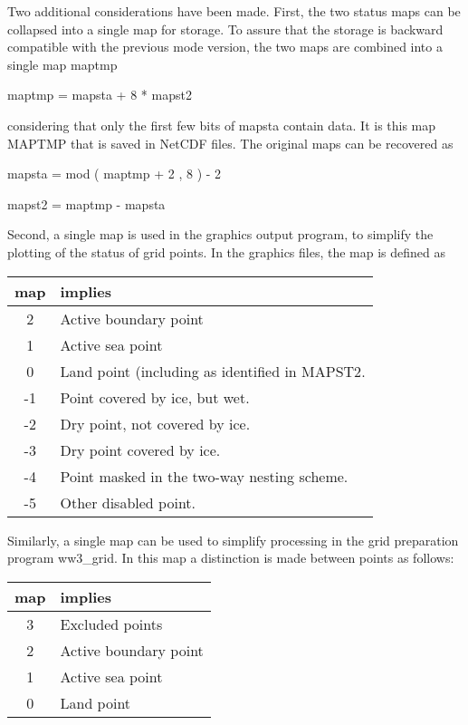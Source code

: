 \noindent
Two additional considerations have been made. First, the two status maps can
be collapsed into a single map for storage. To assure that the storage is
backward compatible with the previous mode version, the two maps are combined
into a single map {\F maptmp}

\vspace{\baselineskip}
\centerline{\F maptmp = mapsta + 8 * mapst2}
\vspace{\baselineskip}

\noindent
considering that only the first few bits of {\F mapsta} contain data.
It is this map MAPTMP that is saved in NetCDF files.  The
original maps can be recovered as

\vspace{\baselineskip}
\centerline{\F mapsta = mod ( maptmp + 2 , 8 ) - 2}
\centerline{\F mapst2 = maptmp - mapsta}
\vspace{\baselineskip}

\noindent
Second, a single map is used in the graphics output program, to simplify the
plotting of the status of grid points. In the graphics files, the map is
defined as

\begin{center} \begin{tabular}{cl}
{map} & implies \\ \hline
  2 & Active boundary point \\
  1 & Active sea point      \\
  0 & Land point (including as identified in {\F MAPST2}. \\
 -1 & Point covered by ice, but wet. \\
 -2 & Dry point, not covered by ice. \\
 -3 & Dry point covered by ice. \\
 -4 & Point masked in the two-way nesting scheme. \\
 -5 & Other disabled point.
\end{tabular} \end{center}

\noindent
Similarly, a single map can be used to simplify processing in the grid
preparation program {\file ww3\_grid}. In this map a distinction is made
between points as follows:

\begin{center} \begin{tabular}{cl}
{map} & implies \\ \hline
  3 & Excluded points \\
  2 & Active boundary point \\
  1 & Active sea point      \\
  0 & Land point 
\end{tabular} \end{center}


